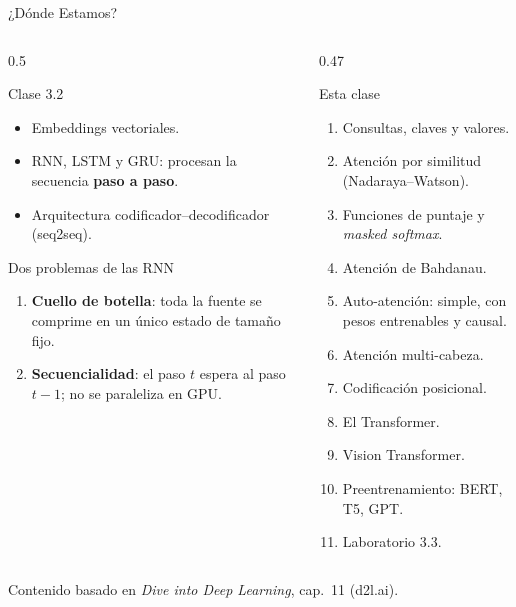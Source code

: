 \documentclass[aspectratio=169, 10pt]{beamer}
\begin{document}
\begin{frame}{¿D\'onde Estamos?}
	\begin{columns}[T]
		\begin{column}{0.5\textwidth}
			\begin{block}{Clase 3.2}
				\small
				\begin{itemize}
					\item Embeddings vectoriales.
					\item RNN, LSTM y GRU: procesan la secuencia \textbf{paso a paso}.
					\item Arquitectura codificador--decodificador (seq2seq).
				\end{itemize}
			\end{block}
			\begin{alertblock}{Dos problemas de las RNN}
				\small
				\begin{enumerate}
					\item \textbf{Cuello de botella}: toda la fuente se comprime en un \'unico estado de tama\~no fijo.
					\item \textbf{Secuencialidad}: el paso $t$ espera al paso $t-1$; no se paraleliza en GPU.
				\end{enumerate}
			\end{alertblock}
		\end{column}
		\begin{column}{0.47\textwidth}
			\begin{block}{Esta clase}
				\small
				\begin{enumerate}
					\item Consultas, claves y valores.
					\item Atenci\'on por similitud (Nadaraya--Watson).
					\item Funciones de puntaje y \emph{masked softmax}.
					\item Atenci\'on de Bahdanau.
					\item Auto-atenci\'on: simple, con pesos entrenables y causal.
					\item Atenci\'on multi-cabeza.
					\item Codificaci\'on posicional.
					\item El Transformer.
					\item Vision Transformer.
					\item Preentrenamiento: BERT, T5, GPT.
					\item Laboratorio 3.3.
				\end{enumerate}
			\end{block}
		\end{column}
	\end{columns}
	\vfill
	{\scriptsize Contenido basado en \emph{Dive into Deep Learning}, cap.\ 11 (d2l.ai).}
\end{frame}
\end{document}
